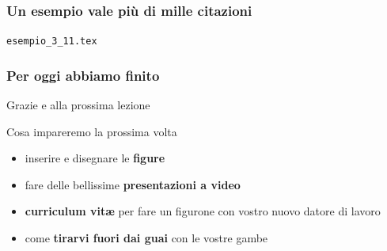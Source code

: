 \documentclass[svgnames,%
	ucs,%
	pdftex]{guitbeamer}
\begin{document}
\begin{frame}
\begin{columns}
		\begin{LaTeXoutput}
			\\
			\\
			\\	
			\\
			\\
			\\
			\\
			\\
			\\
			\\
		\end{LaTeXoutput}
	\end{columns}
\end{frame}
\begin{frame}
  \frametitle{Un esempio vale pi\`u di mille citazioni}
	\begin{center}
		\alert{\texttt{esempio\_3\_11.tex}}
	\end{center}
\end{frame}
\begin{frame}
  \frametitle{Per oggi abbiamo finito}
	\begin{center}
		\huge
		Grazie e alla prossima lezione
	\end{center}
  \medskip
	\begin{block}{Cosa impareremo la prossima volta}
		\begin{itemize}
			\item inserire e disegnare le \textbf{figure}
			\item fare delle bellissime \textbf{presentazioni a video}
			\item \textbf{curriculum vit\ae} per fare un figurone con vostro nuovo datore di lavoro
			\item come \textbf{tirarvi fuori dai guai} con le vostre gambe
		\end{itemize}
	\end{block}
\end{frame}
\end{document}

